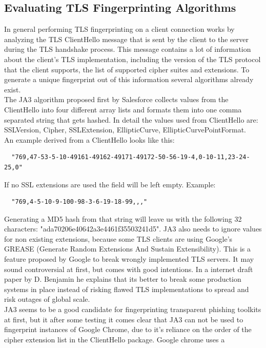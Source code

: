 \documentclass[12pt]{scrbook}
\begin{document}
\subsection{Evaluating TLS Fingerprinting Algorithms} In general performing TLS
fingerprinting on a client connection works by analyzing the TLS ClientHello
message that is sent by the client to the server during the TLS handshake
process. This message contains a lot of information about the client's TLS
implementation, including the version of the TLS protocol that the client
supports, the list of supported cipher suites and extensions. To generate a
unique fingerprint out of this information several algorithms already
exist.\\The JA3 algorithm proposed first by Salesforce \cite{ja3Salesforce}
collects values from the ClientHello into four different array lists and formats
them into one comma separated string that gets hashed. In detail the values used
from ClientHello are: SSLVersion, Cipher, SSLExtension, EllipticCurve,
EllipticCurvePointFormat.\\An example derived from a ClientHello looks like
this:
\begin{verbatim}
  "769,47-53-5-10-49161-49162-49171-49172-50-56-19-4,0-10-11,23-24-25,0"
\end{verbatim}
If no SSL extensions are used the field will be left empty. Example:
\begin{verbatim} 
  "769,4-5-10-9-100-98-3-6-19-18-99,,,"
\end{verbatim}
Generating a MD5 hash
from that string will leave us with the following 32 characters:
"ada70206e40642a3e4461f35503241d5". JA3 also needs to ignore values for non
existing extensions, because some TLS clients are using Google’s GREASE
(Generate Random Extensions And Sustain Extensibility). This is a feature
proposed by Google to break wrongly implemented TLS servers. It may sound
controversial at first, but comes with good intentions. In a internet draft
paper by D. Benjamin \cite{greaseDraft} he explains that its better to break
some production systems in place instead of risking flawed TLS
implementations to spread and risk outages of global scale.\\JA3 seems to be
a good candidate for fingerprinting transparent phishing toolkits at first,
but it after some testing it comes clear that JA3 can not be used to
fingerprint instances of Google Chrome, due to it's reliance on the order of
the cipher extension list in the ClientHello package. Google chrome uses a
\end{document}
